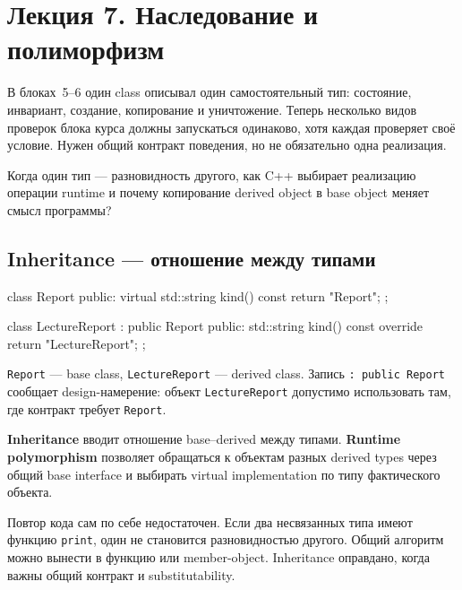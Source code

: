 
\section{Лекция 7. Наследование и полиморфизм}
\label{sec:lecture-07}

В блоках~5--6 один class описывал один самостоятельный тип: состояние,
инвариант, создание, копирование и уничтожение. Теперь несколько видов
проверок блока курса должны запускаться одинаково, хотя каждая проверяет своё
условие. Нужен общий контракт поведения, но не обязательно одна реализация.

\begin{importantbox}
Когда один тип --- разновидность другого, как C++
выбирает реализацию операции runtime и почему копирование derived object в
base object меняет смысл программы?
\end{importantbox}

\subsection{Inheritance --- отношение между типами}

\begin{cppcode}
class Report {
public:
    virtual std::string kind() const { return "Report"; }
};

class LectureReport : public Report {
public:
    std::string kind() const override { return "LectureReport"; }
};
\end{cppcode}

\texttt{Report} --- base class, \texttt{LectureReport} --- derived class.
Запись \texttt{: public Report} сообщает design-намерение: объект
\texttt{LectureReport} допустимо использовать там, где контракт требует
\texttt{Report}.

\begin{definition}
\textbf{Inheritance} вводит отношение base--derived между типами.
\textbf{Runtime polymorphism} позволяет обращаться к объектам разных derived
types через общий base interface и выбирать virtual implementation по типу
фактического объекта.
\end{definition}

Повтор кода сам по себе недостаточен. Если два несвязанных типа имеют функцию
\texttt{print}, один не становится разновидностью другого. Общий алгоритм
можно вынести в функцию или member-object. Inheritance оправдано, когда важны
общий контракт и substitutability.

